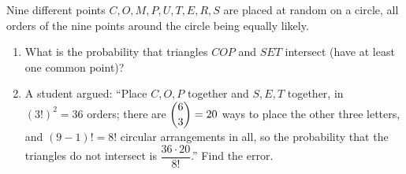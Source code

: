 Nine different points $C,O,M,P,U,T,E,R,S$ are placed at random on a circle, all orders of the nine points around the circle being equally likely.
\begin{enumerate}
\item[(a)] What is the probability that triangles $COP$ and $SET$ intersect (have at least one common point)?
\item[(b)] A student argued: ``Place $C,O,P$ together and $S,E,T$ together, in $(3!)^2=36$ orders; there are $\dbinom63=20$ ways to place the other three letters, and $(9-1)!=8!$ circular arrangements in all, so the probability that the triangles do not intersect is $\dfrac{36\cdot20}{8!}$.'' Find the error.
\end{enumerate}
